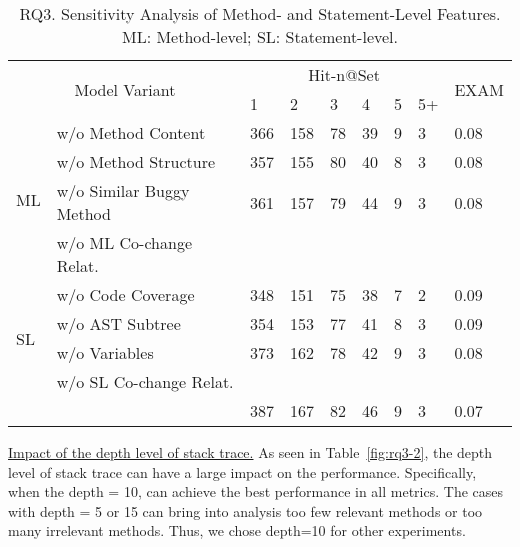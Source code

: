 \begin{table}[t]
	\caption{RQ3. Sensitivity Analysis of Method- and Statement-Level Features. ML: Method-level; SL: Statement-level.}
	{\small
		\begin{center}
			\renewcommand{\arraystretch}{1}
			\begin{tabular}{p{0.3cm}<{\centering}|p{3cm}|p{0.3cm}<{\centering}|p{0.3cm}<{\centering}|p{0.2cm}<{\centering}|p{0.2cm}<{\centering}|p{0.15cm}<{\centering}|p{0.15cm}<{\centering}|p{0.5cm}<{\centering}}
				\hline
				\multicolumn{2}{c|}{\multirow{2}{*}{Model Variant}}    & \multicolumn{6}{c|}{Hit-n@Set}& \multirow{2}{*}{EXAM}\\
				\cline{3-8}
				                 \multicolumn{2}{c|}{}   &1&2&3&4&5&5+&\\
				
				\hline 
				\multirow{4}{*}{ML}&w/o Method Content              & 366 & 158 & 78  & 39 & 9 & 3   & 0.08\\\cline{2-9}
				&w/o	Method Structure	                        & 357 & 155 & 80  & 40 & 8 & 3   & 0.08\\ \cline{2-9}
				&w/o Similar Buggy Method    	& 361 & 157 & 79  & 44 & 9 & 3   & 0.08\\ \cline{2-9}
				&w/o ML Co-change Relat.         &  &  &   &  &  &    & \\ \cline{2-9}
				\hline
				\multirow{4}{*}{SL}&w/o Code Coverage               & 348 & 151 & 75  & 38 & 7 & 2   & 0.09\\\cline{2-9}
				&w/o	AST Subtree	        & 354 & 153 & 77  & 41 & 8 & 3   & 0.09\\ \cline{2-9}
				&w/o Variables               	& 373 & 162 & 78  & 42 & 9 & 3   & 0.08\\ \cline{2-9}
				&w/o SL Co-change Relat.        &  &  &   &  &  &    & \\ \cline{2-9}
				\hline
			&	\tool                           & 387 & 167 & 82  & 46 & 9 & 3   & 0.07\\ \cline{2-9}
				\hline
			\end{tabular}
			
			\label{fig:rq3-1}
		\end{center}
	}
\end{table}

\underline{Impact of the depth level of stack trace.} 
As seen in Table~\ref{fig:rq3-2}, the depth level of stack trace can
have a large impact on the performance. Specifically, when the depth =
10, {\tool} can achieve the best performance in all metrics. The cases
with depth = 5 or 15 can bring into analysis too few relevant methods
or too many irrelevant methods. Thus, we chose depth=10 for other
experiments.

